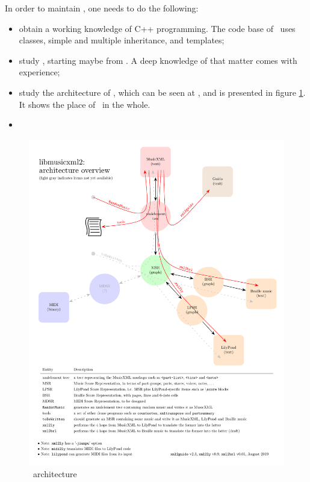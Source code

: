 \documentclass[12pt,a4paper]{article}
\begin{document}
In order to maintain \xmlToLy, one needs to do the following:
\begin{itemize}
\item obtain a working knowledge of C++ programming. The code base of \xmlToLy\ uses classes, simple and multiple inheritance, and templates;

\item study \mxml, starting maybe from . A deep knowledge of that matter comes with experience;

\item study the architecture of \lib, which can be seen at , and is presented in figure \ref{libmusicxmlArchitecture}.
It shows the place of \xmlToLy\ in the whole.

\item
\end{itemize}

\begin{figure}
\caption{\lib\ architecture}\label{libmusicxmlArchitecture}
\includegraphics[scale=0.8]{../libmusicxmlArchitecture/libmusicxmlArchitecture.pdf}
\end{figure}
\end{document}

